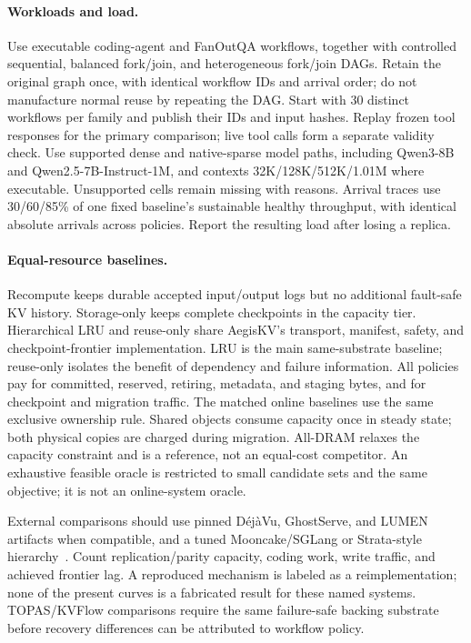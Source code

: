 \documentclass[sigplan,10pt,anonymous,nonacm]{acmart}
\begin{document}
\paragraph{Workloads and load.}
Use executable coding-agent and FanOutQA workflows, together with controlled
sequential, balanced fork/join, and heterogeneous fork/join DAGs. Retain
the original graph once, with identical workflow IDs and arrival order;
do not manufacture normal reuse by repeating the DAG. Start with 30
distinct workflows per family and publish their IDs and input hashes.
Replay frozen tool responses for the primary comparison; live tool calls
form a separate validity check. Use supported dense and native-sparse
model paths, including Qwen3-8B and Qwen2.5-7B-Instruct-1M, and contexts
32K/128K/512K/1.01M where executable. Unsupported cells remain missing
with reasons. Arrival traces use 30/60/85\% of one fixed baseline's
sustainable healthy throughput, with identical absolute arrivals across
policies. Report the resulting load after losing a replica.

\paragraph{Equal-resource baselines.}
Recompute keeps durable accepted input/output logs but no additional
fault-safe KV history. Storage-only keeps complete checkpoints in the
capacity tier. Hierarchical LRU and reuse-only share AegisKV's transport,
manifest, safety, and checkpoint-frontier implementation. LRU is the main
same-substrate baseline; reuse-only isolates the benefit of dependency and
failure information. All policies pay for committed, reserved, retiring,
metadata, and staging bytes, and for checkpoint and migration traffic.
The matched online baselines use the same exclusive ownership rule.
Shared objects consume capacity once in steady state; both physical
copies are charged during migration. All-DRAM relaxes
the capacity constraint and is a reference, not an equal-cost competitor.
An exhaustive feasible oracle is restricted to small candidate sets and
the same objective; it is not an online-system oracle.

External comparisons should use pinned D\'ej\`aVu, GhostServe, and LUMEN
artifacts when compatible, and a tuned Mooncake/SGLang or Strata-style
hierarchy~\cite{strati2024dejavu,jayakody2026ghostserve,cao2026lumen,qin2025mooncake,xie2026strata}.
Count replication/parity capacity, coding work, write traffic, and achieved
frontier lag. A reproduced mechanism is labeled as a reimplementation;
none of the present curves is a fabricated result for these named systems.
TOPAS/KVFlow comparisons require the same failure-safe backing substrate
before recovery differences can be attributed to workflow policy.
\end{document}
